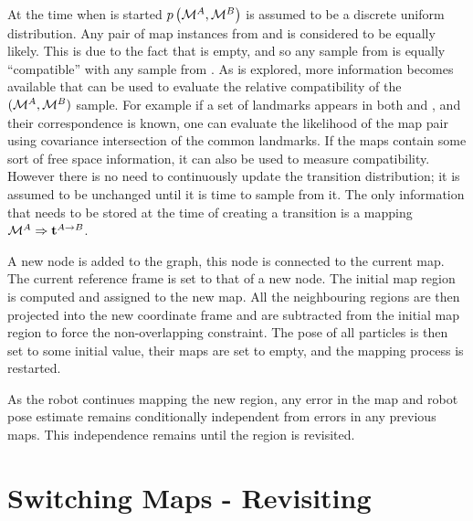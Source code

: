 At the time when \mapB is started $\prob{\mapA,\mapB}$ is assumed to
be a discrete uniform distribution. Any pair of map instances from
\mapA and \mapB is considered to be equally likely. This is due
to the fact that \mapB is empty, and so any sample from \mapB is
equally ``compatible'' with any sample from \mapA. As \mapB is
explored, more information becomes available that can be used to
evaluate the relative compatibility of the $(\mapA,\mapB)$ sample. For
example if a set of landmarks appears in both \mapA and \mapB, and
their correspondence is known, one can evaluate the likelihood of the
map pair using covariance intersection \cite{cov_intersection}
of the common landmarks. If the maps contain some sort of free space
information, it can also be used to measure compatibility. However
there is no need to continuously update the transition distribution;
it is assumed to be unchanged until it is time to sample from it. The
only information that needs to be stored at the time of creating a
transition is a mapping $\mapA \Rightarrow \tr{}{A}{B}$.

A new node is added to the graph, this node is connected to the
current map.  The current reference frame is set to that of a new
node. The initial map region is computed and assigned to the new
map. All the neighbouring regions are then projected into the new
coordinate frame and are subtracted from the initial map region to
force the non-overlapping constraint. The pose of all particles is then
set to some initial value, their maps are set to empty, and the
mapping process is restarted.

As the robot continues mapping the new region, any error in the map
and robot pose estimate remains conditionally independent from errors
in any previous maps. This independence remains until the region is
revisited.


\section{Switching Maps - Revisiting}
\label{sec:revisiting}

